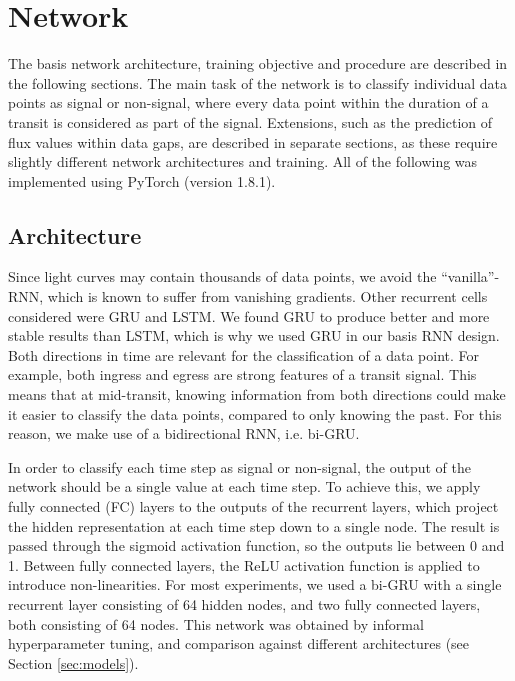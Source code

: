 
\section{Network}
\label{sec:network}

The basis network architecture, training objective and procedure are described in the following sections. The main task of the network is to classify individual data points as signal or non-signal, where every data point within the duration of a transit is considered as part of the signal. Extensions, such as the prediction of flux values within data gaps, are described in separate sections, as these require slightly different network architectures and training. All of the following was implemented using PyTorch (version 1.8.1).

\subsection{Architecture}
\label{sec:architecture}

Since light curves may contain thousands of data points, we avoid the ``vanilla''-RNN, which is known to suffer from vanishing gradients. Other recurrent cells considered were GRU and LSTM. We found GRU to produce better and more stable results than LSTM, which is why we used GRU in our basis RNN design. Both directions in time are relevant for the classification of a data point. For example, both ingress and egress are strong features of a transit signal. This means that at mid-transit, knowing information from both directions could make it easier to classify the data points, compared to only knowing the past. For this reason, we make use of a bidirectional RNN, i.e. bi-GRU.

In order to classify each time step as signal or non-signal, the output of the network should be a single value at each time step. To achieve this, we apply fully connected (FC) layers to the outputs of the recurrent layers, which project the hidden representation at each time step down to a single node. The result is passed through the sigmoid activation function, so the outputs lie between 0 and 1. Between fully connected layers, the ReLU activation function is applied to introduce non-linearities. For most experiments, we used a bi-GRU with a single recurrent layer consisting of 64 hidden nodes, and two fully connected layers, both consisting of 64 nodes. This network was obtained by informal hyperparameter tuning, and comparison against different architectures (see Section \ref{sec:models}).


